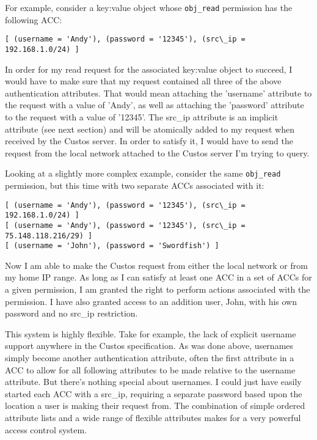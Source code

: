 For example, consider a key:value object whose \texttt{obj\_read}
permission has the following ACC:

\begin{Verbatim}[samepage=true]
[ (username = 'Andy'), (password = '12345'), (src\_ip = 192.168.1.0/24) ]
\end{Verbatim}

In order for my read request for the associated key:value object to
succeed, I would have to make sure that my request contained all three
of the above authentication attributes. That would mean attaching the
'username' attribute to the request with a value of 'Andy', as well as
attaching the 'password' attribute to the request with a value of
'12345'. The src\_ip attribute is an implicit attribute (see next
section) and will be atomically added to my request when received by
the Custos server. In order to satisfy it, I would have to send the
request from the local network attached to the Custos server I'm
trying to query.

Looking at a slightly more complex example, consider the same
\texttt{obj\_read} permission, but this time with two separate ACCs
associated with it:

\begin{Verbatim}[samepage=true]
[ (username = 'Andy'), (password = '12345'), (src\_ip = 192.168.1.0/24) ]
[ (username = 'Andy'), (password = '12345'), (src\_ip = 75.148.118.216/29) ]
[ (username = 'John'), (password = 'Swordfish') ]
\end{Verbatim}

Now I am able to make the Custos request from either the local network
or from my home IP range. As long as I can satisfy at least one ACC in
a set of ACCs for a given permission, I am granted the right to
perform actions associated with the permission. I have also granted
access to an addition user, John, with his own password and no src\_ip
restriction.

This system is highly flexible. Take for example, the lack of explicit
username support anywhere in the Custos specification. As was done
above, usernames simply become another authentication attribute, often
the first attribute in a ACC to allow for all following attributes to
be made relative to the username attribute. But there's nothing
special about usernames. I could just have easily started each ACC
with a src\_ip, requiring a separate password based upon the location
a user is making their request from. The combination of simple ordered
attribute lists and a wide range of flexible attributes makes for a
very powerful access control system.

